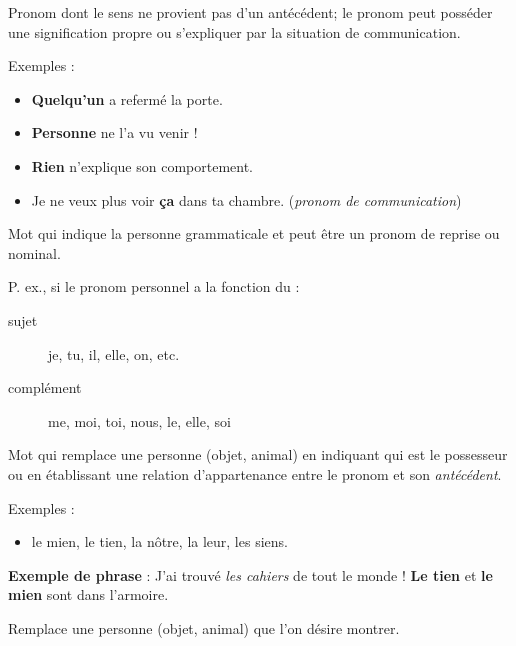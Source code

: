\documentclass[10pt, french]{article}
\begin{document}
\begin{multicols*}{2}
\begin{definitionNOHFILLsub}
Pronom dont le sens ne provient pas d'un antécédent; le pronom peut posséder une signification propre ou s'expliquer par la situation de communication.

\tcbline

Exemples :
\begin{itemize}
	\item	\textbf{Quelqu'un} a refermé la porte.
	\item	\textbf{Personne} ne l'a vu venir !
	\item	\textbf{Rien} n'explique son comportement.
	\item	Je ne veux plus voir \textbf{ça} dans ta chambre. (\textit{pronom de communication})
\end{itemize}
\end{definitionNOHFILLsub}

\begin{definitionNOHFILLsub}
Mot qui indique la personne grammaticale et peut être un pronom de reprise ou nominal.

\tcbline

P. ex., si le pronom personnel a la fonction du :
\begin{description}
	\item[sujet]	je, tu, il, elle, on, etc. 
	\item[complément]	me, moi, toi, nous, le, elle, soi 
\end{description}
\end{definitionNOHFILLsub}

\begin{definitionNOHFILLsub}
Mot qui remplace une personne (objet, animal) en indiquant qui est le possesseur ou en établissant une relation d'appartenance entre le pronom et son \textit{antécédent}.

\tcbline

Exemples :
\begin{itemize}
	\item	le mien, le tien, la nôtre, la leur, les siens.
\end{itemize}

\textbf{Exemple de phrase} : J'ai trouvé \textit{les cahiers} de tout le monde ! \textbf{Le tien} et \textbf{le mien} sont dans l'armoire.
\end{definitionNOHFILLsub}

\begin{definitionNOHFILLsub}
Remplace une personne (objet, animal) que l'on désire montrer.


\end{definitionNOHFILLsub}
\end{multicols*}
\end{document}
